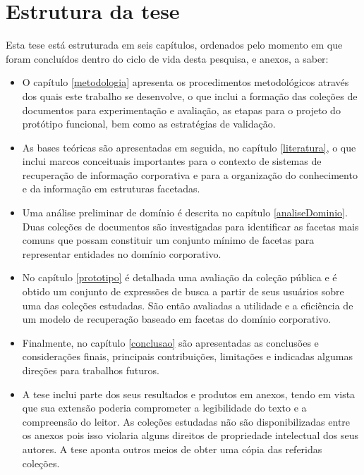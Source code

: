 \section{Estrutura da tese}

Esta tese está estruturada em seis capítulos, ordenados pelo momento em que foram concluídos dentro do ciclo de vida desta pesquisa, e anexos, a saber:

\begin{itemize}


	\item O capítulo \ref{metodologia} apresenta os procedimentos metodológicos através dos quais este trabalho se desenvolve, o que inclui a formação das coleções de documentos para experimentação e avaliação, as etapas para o projeto do protótipo funcional, bem como as estratégias de validação.

	\item As bases teóricas são apresentadas em seguida, no capítulo \ref{literatura}, o que inclui marcos conceituais importantes para o contexto de sistemas de recuperação de informação corporativa e para a organização do conhecimento e da informação em estruturas facetadas.

	\item Uma análise preliminar de domínio é descrita no capítulo \ref{analiseDominio}. Duas coleções de documentos são investigadas para identificar as facetas mais comuns que possam constituir um conjunto mínimo de facetas para representar entidades no domínio corporativo.

	\item No capítulo \ref{prototipo} é detalhada uma avaliação da coleção pública e é obtido um conjunto de expressões de busca a partir de seus usuários sobre uma das coleções estudadas. São então avaliadas a utilidade e a eficiência de um modelo de recuperação baseado em facetas do domínio corporativo.

	\item Finalmente, no capítulo \ref{conclusao} são apresentadas as conclusões e considerações finais, principais contribuições, limitações e indicadas algumas direções para trabalhos futuros.

	\item A tese inclui parte dos seus resultados e produtos em anexos, tendo em vista que sua extensão poderia comprometer a legibilidade do texto e a compreensão do leitor. As coleções estudadas não são disponibilizadas entre os anexos pois isso violaria alguns direitos de propriedade intelectual dos seus autores. A tese aponta outros meios de obter uma cópia das referidas coleções.
	
\end{itemize}

